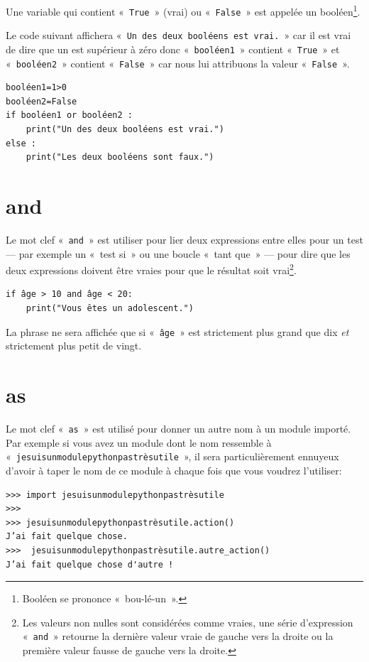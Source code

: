 Une variable qui contient « \texttt{True} » (vrai) ou « \texttt{False} » est appelée un booléen\footnote{Booléen se prononce « bou-lé-un ».}.  

Le code suivant affichera « \texttt{Un des deux booléens est vrai.} » car il est vrai de dire que un est supérieur à zéro donc « \texttt{booléen1} » contient « \texttt{True} » et « \texttt{booléen2} » contient « \texttt{False} » car nous lui attribuons la valeur « \texttt{False} ».
  
\begin{Verbatim}[frame=single,rulecolor=\color{gray}]
booléen1=1>0
booléen2=False
if booléen1 or booléen2 :
    print("Un des deux booléens est vrai.")
else :
	print("Les deux booléens sont faux.")
\end{Verbatim}

\section*{and}

Le mot clef « \texttt{and} » est utiliser pour lier deux expressions entre elles pour un test --- par exemple un « test si » ou une boucle « tant que » --- pour dire que les deux expressions doivent être vraies pour que le résultat soit vrai\footnote{Les valeurs non nulles sont considérées comme vraies, une série d'expression « \texttt{and} » retourne la dernière valeur vraie de gauche vers la droite ou la  première valeur fausse de gauche vers la droite.}.

\begin{Verbatim}[frame=single,rulecolor=\color{gray}]
if âge > 10 and âge < 20:
    print("Vous êtes un adolescent.")
\end{Verbatim}

La phrase ne sera affichée que si « \texttt{âge} » est strictement plus grand que dix \emph{et} strictement plus petit de vingt.

\section*{as}

Le mot clef « \texttt{as} » est utilisé pour donner un autre nom à un module importé. Par exemple si vous avez un module dont le nom ressemble à « \texttt{jesuisunmodulepythonpastrèsutile} », il sera particulièrement ennuyeux d'avoir à taper le nom de ce module à chaque fois que vous voudrez l'utiliser:
\begin{Verbatim}[frame=single,rulecolor=\color{gray}]
>>> import jesuisunmodulepythonpastrèsutile
>>>
>>> jesuisunmodulepythonpastrèsutile.action()
J’ai fait quelque chose.
>>>  jesuisunmodulepythonpastrèsutile.autre_action()
J’ai fait quelque chose d'autre !
\end{Verbatim}

